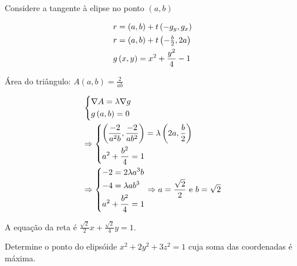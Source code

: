 \documentclass{book}
\begin{document}
\begin{sol}
Considere a tangente \`a elipse no ponto $(a,b)$


\[
\begin{gathered}
r = \left( {a,b} \right) + t\left( { - g_y ,g_x } \right) \hfill \\
r = \left( {a,b} \right) + t\left( { - \tfrac{b}{2},2a} \right) \hfill \\
g\left( {x,y} \right) = x^2  + \frac{{y^2 }}{4} - 1 \hfill \\
\end{gathered}
\]

\'Area do tri\^angulo: $A\left( {a,b} \right) = \displaystyle \frac{2}{{ab}}$

\[
\begin{gathered}
\left\{ \begin{gathered}
\nabla A = \lambda \nabla g \hfill \\
g\left( {a,b} \right) = 0 \hfill \\
\end{gathered}  \right. \hfill \\
\Rightarrow \left\{ \begin{gathered}
\left( {\frac{{ - 2}}
{{a^2 b}},\frac{{ - 2}}
{{ab^2 }}} \right) = \lambda \left( {2a,\frac{b}
{2}} \right) \hfill \\
a^2  + \frac{{b^2 }}
{4} = 1 \hfill \\
\end{gathered}  \right. \hfill \\
\Rightarrow \left\{ \begin{gathered}
- 2 = 2\lambda a^3 b \hfill \\
- 4 = \lambda ab^3  \hfill \\
a^2  + \frac{{b^2 }}
{4} = 1 \hfill \\
\end{gathered}  \right. \Rightarrow a = \frac{{\sqrt 2 }}
{2}{\text{ e }}b = \sqrt 2  \hfill \\
\end{gathered}
\]

A equa\c c\~ao da reta \'e $\tfrac{{\sqrt 2 }}{2}x + \tfrac{{\sqrt 2 }}{4}y = 1$.

\end{sol}

\begin{ex}
    Determine o ponto do elips\'oide $x^2  + 2y^2  + 3z^2  = 1$ cuja soma das coordenadas \'e m\'axima.
\end{ex}
\end{document}
